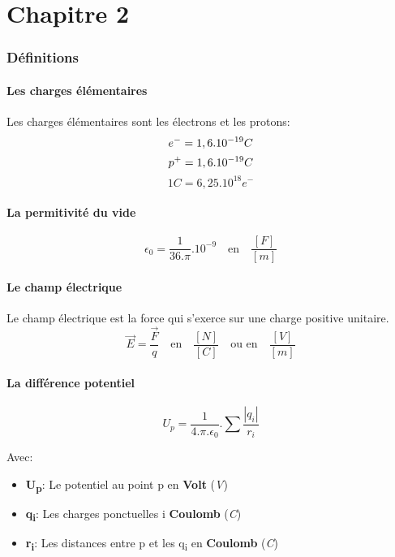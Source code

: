 \part{Chapitre 2}
\section{Définitions}
\subsection{Les charges élémentaires}
Les charges élémentaires sont les électrons et les protons:
\begin{equation}
	e^- = 1,6.10^{-19}C\\
\end{equation}
\begin{equation}
	p^+ = 1,6.10^{-19}C\\
\end{equation}
\begin{equation}
	1C = 6,25.10^{18}e^-
\end{equation}
 \subsection{La permitivité du vide}

 \begin{equation}
	 \epsilon_{0} = \frac{1}{36.\pi}.10^{-9} \quad \textrm{en} \quad \frac{[F]}{[m]}
 \end{equation}

 \subsection{Le champ électrique}
 Le champ électrique est la force qui s'exerce sur une charge positive unitaire.
 \begin{equation}
	 \overrightarrow{E} = \frac{\overrightarrow{F}}{q} \quad \textrm{en} \quad \frac{[N]}{[C]} \quad \textrm{ou en} \quad \frac{[V]}{[m]}
 \end{equation}

 \subsection{La différence potentiel}
 \begin{equation}
	 U_{p} = \frac{1}{4.\pi.\epsilon_{0}}.\sum\frac{|q_{i}|}{r_{i}}
 \end{equation}

 Avec:
 \begin{itemize}
	 \item \textbf{U\textsubscript{p}}: Le potentiel au point p en \textbf{Volt} (\textit{V})
	 \item \textbf{q\textsubscript{i}}: Les charges ponctuelles i \textbf{Coulomb} (\textit{C})
	 \item \textbf{r\textsubscript{i}}: Les distances entre p et les q\textsubscript{i} en \textbf{Coulomb} (\textit{C})
 \end{itemize}

